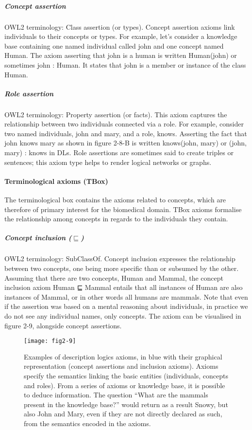 \subparagraph{Concept assertion\\}
OWL2 terminology: Class assertion (or types). Concept assertion axioms link individuals to their concepts or types. For example, let’s consider a knowledge base containing one named individual called john and one concept named Human. The axiom asserting that john is a human is written Human(john) or sometimes john : Human. It states that john is a member or instance of the class Human.

\subparagraph{Role assertion\\}
OWL2 terminology: Property assertion (or facts). This axiom captures the relationship between two individuals connected via a role. For example, consider two named individuals, john and mary, and a role, knows. Asserting the fact that john knows mary as shown in figure 2-8-B is written knows(john, mary) or (john, mary) : knows in DLs. Role assertions are sometimes said to create triples or sentences; this axiom type helps to render logical networks or graphs.

\paragraph{\textbf{Terminological axioms (TBox)}\\}

The terminological box contains the axioms related to concepts, which are therefore of primary interest for the biomedical domain. TBox axioms formalise the relationship among concepts in regards to the individuals they contain.

\subparagraph{Concept inclusion ($ \sqsubseteq $)\\}
OWL2 terminology: SubClassOf. Concept inclusion expresses the relationship between two concepts, one being more specific than or subsumed by the other. Assuming that there are two concepts, Human and Mammal, the concept inclusion axiom Human ⊑ Mammal entails that all instances of Human are also instances of Mammal, or in other words all humans are mammals. Note that even if the assertion was based on a mental reasoning about individuals, in practice we do not see any individual names, only concepts. The axiom can be visualised in figure 2-9, alongside concept assertions.

\begin{figure}[ht]
    \centering
    \texttt{[image: fig2-9]}
    \caption{Examples of description logics axioms, in blue with their graphical representation (concept assertions and inclusion axioms). Axioms specify the semantics linking the basic entities (individuals, concepts and roles). From a series of axioms or knowledge base, it is possible to deduce information. The question “What are the mammals present in the knowledge base?” would return as a result Snowy, but also John and Mary, even if they are not directly declared as such, from the semantics encoded in the axioms.}
    \label{fig2-9}
\end{figure}

